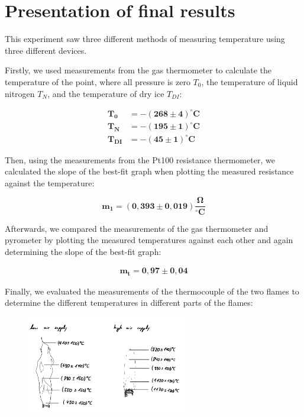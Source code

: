 \documentclass{article}
\begin{document}
\newpage
\section{Presentation of final results}

This experiment saw three different methods of measuring temperature using three different devices. 

Firstly, we used measurements from the gas thermometer to calculate the temperature of the point, where all pressure is zero $T_0$, the temperature of liquid nitrogen $T_N$, and the temperature of dry ice $T_{DI}$:

\begin{equation}
    \begin{split}
        \bm{T_0} &= \bm{-(268 \pm 4)^{\circ}} \textbf{C} \\
        \bm{T_N} &= \bm{-(195 \pm 1)^{\circ}\textbf{C}} \\
        \bm{T_{DI}} &= \bm{-(45 \pm 1)^{\circ}\textbf{C}}
    \end{split}
\end{equation}

Then, using the measurements from the Pt100 resistance thermometer, we calculated the slope of the best-fit graph when plotting the measured resistance against the temperature:

\begin{equation}
\bm{m_1} = \bm{(0,393 \pm 0,019) \frac{\Omega}{^{\circ}\textbf{C}}}
\end{equation}

Afterwards, we compared the measurements of the gas thermometer and pyrometer by plotting the measured temperatures against each other and again determining the slope of the best-fit graph:

\begin{equation}
    \begin{split}
    \bm{m_t} = \bm{0,97 \pm 0,04} 
    \end{split}
\end{equation}

Finally, we evaluated the measurements of the thermocouple of the two flames to determine the different temperatures in different parts of the flames:

\begin{figure} [!h]
    \centering
    \includegraphics[width=7cm]{graphics/sketchflame.jpg}
\end{figure}
\end{document}
